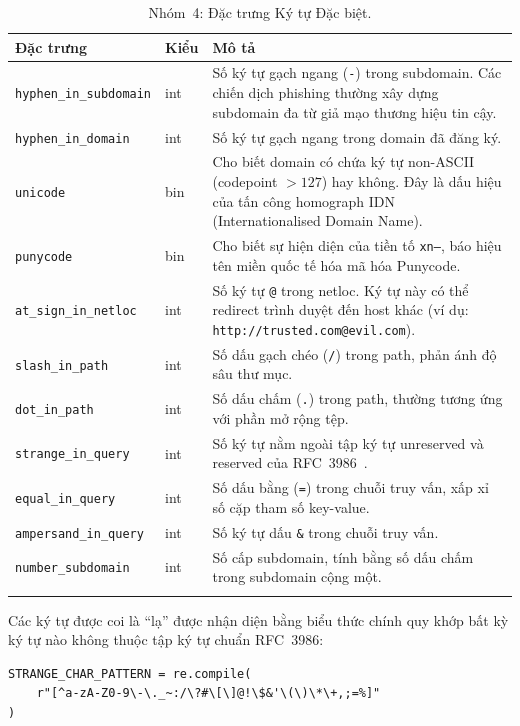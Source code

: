 \documentclass[a4paper,12pt]{article}
\begin{document}
\begin{longtable}{p{5.2cm}p{1.3cm}p{6.5cm}}
\toprule
\textbf{Đặc trưng} & \textbf{Kiểu} & \textbf{Mô tả} \\
\midrule
\endhead
\texttt{hyphen\_in\_subdomain} & int & Số ký tự gạch ngang (\texttt{-}) trong subdomain. Các chiến dịch phishing thường xây dựng subdomain đa từ giả mạo thương hiệu tin cậy. \\
\texttt{hyphen\_in\_domain}    & int & Số ký tự gạch ngang trong domain đã đăng ký. \\
\texttt{unicode}               & bin & Cho biết domain có chứa ký tự non-ASCII (codepoint $> 127$) hay không. Đây là dấu hiệu của tấn công homograph IDN (Internationalised Domain Name). \\
\texttt{punycode}              & bin & Cho biết sự hiện diện của tiền tố \texttt{xn--}, báo hiệu tên miền quốc tế hóa mã hóa Punycode. \\
\texttt{at\_sign\_in\_netloc}  & int & Số ký tự \texttt{@} trong netloc. Ký tự này có thể redirect trình duyệt đến host khác (ví dụ: \texttt{http://trusted.com@evil.com}). \\
\texttt{slash\_in\_path}       & int & Số dấu gạch chéo (\texttt{/}) trong path, phản ánh độ sâu thư mục. \\
\texttt{dot\_in\_path}         & int & Số dấu chấm (\texttt{.}) trong path, thường tương ứng với phần mở rộng tệp. \\
\texttt{strange\_in\_query}    & int & Số ký tự nằm ngoài tập ký tự unreserved và reserved của RFC~3986~\cite{rfc3986}. \\
\texttt{equal\_in\_query}      & int & Số dấu bằng (\texttt{=}) trong chuỗi truy vấn, xấp xỉ số cặp tham số key-value. \\
\texttt{ampersand\_in\_query}  & int & Số ký tự dấu \texttt{\&} trong chuỗi truy vấn. \\
\texttt{number\_subdomain}     & int & Số cấp subdomain, tính bằng số dấu chấm trong subdomain cộng một. \\
\bottomrule
\caption{Nhóm~4: Đặc trưng Ký tự Đặc biệt.}
\label{tab:special_char}
\end{longtable}

Các ký tự được coi là ``lạ'' được nhận diện bằng biểu thức chính quy khớp bất kỳ ký tự nào không thuộc tập ký tự chuẩn RFC~3986:

\begin{lstlisting}[caption={Mẫu phát hiện ký tự phi chuẩn (phần bù RFC 3986)}]
STRANGE_CHAR_PATTERN = re.compile(
    r"[^a-zA-Z0-9\-\._~:/\?#\[\]@!\$&'\(\)\*\+,;=%]"
)
\end{lstlisting}
\end{document}
